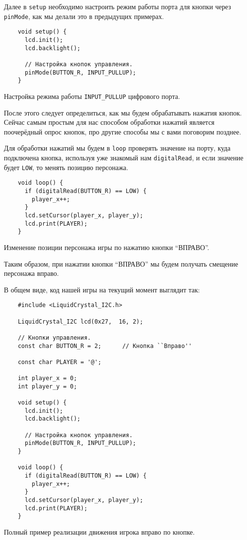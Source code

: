 \documentclass[../sparc.tex]{subfiles}
\begin{document}
Далее в \texttt{setup} необходимо настроить режим работы порта для кнопки через
\texttt{pinMode}, как мы делали это в предыдущих примерах.

\begin{listing}[H]
  \begin{verbatim}
    void setup() {
      lcd.init();
      lcd.backlight();

      // Настройка кнопок управления.
      pinMode(BUTTON_R, INPUT_PULLUP);
    }
  \end{verbatim}
  \caption{Настройка режима работы \texttt{INPUT\_PULLUP} цифрового порта.}
  \label{listing:game-dev-input-pullup-mode}
\end{listing}

После этого следует определиться, как мы будем обрабатывать нажатия кнопок.
Сейчас самым простым для нас способом обработки нажатий является поочерёдный
опрос кнопок, про другие способы мы с вами поговорим позднее.

Для обработки нажатий мы будем в \texttt{loop} проверять значение на порту, куда
подключена кнопка, используя уже знакомый нам \texttt{digitalRead}, и если
значение будет \texttt{LOW}, то менять позицию персонажа.

\begin{listing}[H]
  \begin{verbatim}
    void loop() {
      if (digitalRead(BUTTON_R) == LOW) {
        player_x++;
      }
      lcd.setCursor(player_x, player_y);
      lcd.print(PLAYER);
    }
  \end{verbatim}
  \caption{Изменение позиции персонажа игры по нажатию кнопки ``ВПРАВО''.}
  \label{listing:game-dev-button-right}
\end{listing}

Таким образом, при нажатии кнопки ``ВПРАВО'' мы будем получать смещение
персонажа вправо.

В общем виде, код нашей игры на текущий момент выглядит так:

\begin{listing}[H]
  \begin{verbatim}
    #include <LiquidCrystal_I2C.h>

    LiquidCrystal_I2C lcd(0x27,  16, 2);

    // Кнопки управления.
    const char BUTTON_R = 2;      // Кнопка ``Вправо''

    const char PLAYER = '@';

    int player_x = 0;
    int player_y = 0;

    void setup() {
      lcd.init();
      lcd.backlight();

      // Настройка кнопок управления.
      pinMode(BUTTON_R, INPUT_PULLUP);
    }

    void loop() {
      if (digitalRead(BUTTON_R) == LOW) {
        player_x++;
      }
      lcd.setCursor(player_x, player_y);
      lcd.print(PLAYER);
    }
  \end{verbatim}
  \caption{Полный пример реализации движения игрока вправо по кнопке.}
  \label{listing:game-dev-button-right-full-example}
\end{listing}
\end{document}
